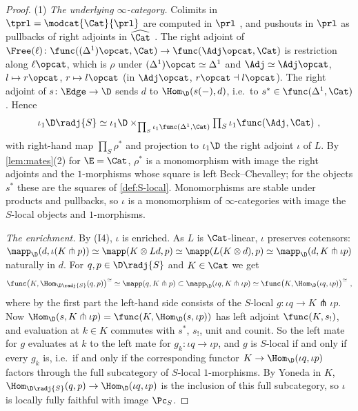 \begin{proof}
(1) \emph{The underlying $\infty$-category.}
Colimits in $\tprl = \modcat{\Cat}{\prl}$ are computed in $\prl$ \cite[4.2.3.5]{ha}, and pushouts in $\prl$ as pullbacks of right adjoints in $\widehat{\Cat}$ \cite[5.5.3.4, 5.5.3.18]{htt}.
The right adjoint of $\Free(\ell)\colon \func((\Delta^{1})\opcat,\Cat) \to \func(\Adj\opcat,\Cat)$ is restriction along $\ell\opcat$, which is $\rho$ under $(\Delta^{1})\opcat \simeq \Delta^{1}$ and $\Adj \simeq \Adj\opcat$, $l \mapsto r\opcat$, $r \mapsto l\opcat$ (in $\Adj\opcat$, $r\opcat \dashv l\opcat$). The right adjoint of $s\colon \Edge \to \D$ sends $d$ to $\Hom_{\D}(s(-),d)$, i.e.\ to $s^{*} \in \func(\Delta^{1},\Cat)$. Hence
\begin{equation}
\label{eq:pullback}
\iota_{1}\D\radj{S} \simeq \iota_{1}\D \times_{\prod_{S}\iota_{1}\func(\Delta^{1},\Cat)} \textstyle\prod_{S}\iota_{1}\func(\Adj,\Cat) \ ,
\end{equation}
with right-hand map $\prod_{S}\rho^{*}$ and projection to $\iota_{1}\D$ the right adjoint $\iota$ of $L$.
By \cref{lem:mates}(2) for $\E = \Cat$, $\rho^{*}$ is a monomorphism with image the right adjoints and the $1$-morphisms whose square is left Beck--Chevalley; for the objects $s^{*}$ these are the squares of \cref{def:S-local}. Monomorphisms are stable under products and pullbacks, so $\iota$ is a monomorphism of $\infty$-categories with image the $S$-local objects and $1$-morphisms.

\emph{The enrichment.}
By (I4), $\iota$ is enriched. As $L$ is $\Cat$-linear, $\iota$ preserves cotensors: $\mapp_{\D}(d,\iota(K \pitchfork p)) \simeq \mapp(K \otimes Ld,p) \simeq \mapp(L(K \otimes d),p) \simeq \mapp_{\D}(d,K \pitchfork \iota p)$ naturally in $d$.
For $q,p \in \D\radj{S}$ and $K \in \Cat$ we get
\[
\func\bigl(K,\Hom_{\D\radj{S}}(q,p)\bigr)^{\simeq} \simeq \mapp(q,K \pitchfork p) \subset \mapp_{\D}(\iota q,K \pitchfork \iota p) \simeq \func\bigl(K,\Hom_{\D}(\iota q,\iota p)\bigr)^{\simeq} \ ,
\]
where by the first part the left-hand side consists of the $S$-local $g\colon \iota q \to K \pitchfork \iota p$.
Now $\Hom_{\D}(s,K \pitchfork \iota p) = \func(K,\Hom_{\D}(s,\iota p))$ has left adjoint $\func(K,s_{!})$, and evaluation at $k \in K$ commutes with $s^{*}$, $s_{!}$, unit and counit. So the left mate for $g$ evaluates at $k$ to the left mate for $g_{k}\colon \iota q \to \iota p$, and $g$ is $S$-local if and only if every $g_{k}$ is, i.e.\ if and only if the corresponding functor $K \to \Hom_{\D}(\iota q,\iota p)$ factors through the full subcategory of $S$-local $1$-morphisms. By Yoneda in $K$, $\Hom_{\D\radj{S}}(q,p) \to \Hom_{\D}(\iota q,\iota p)$ is the inclusion of this full subcategory, so $\iota$ is locally fully faithful with image $\Pc_{S}$.


\end{proof}
